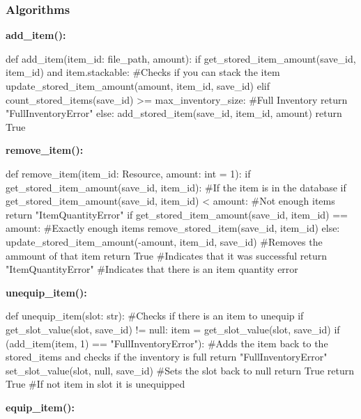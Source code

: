 \documentclass{article}
\begin{document}
        \subsubsection{Algorithms}
        \textbf{add\_item():}\\
        \begin{python}
def add_item(item_id: file_path, amount):
   if get_stored_item_amount(save_id, item_id) and item.stackable: #Checks if you can stack the item
      update_stored_item_amount(amount, item_id, save_id)
   elif count_stored_items(save_id) >= max_inventory_size: #Full Inventory
      return "FullInventoryError"
   else:
      add_stored_item(save_id, item_id, amount)
   return True
        \end{python}
        \textbf{remove\_item():}\\
        \begin{python}
def remove_item(item_id: Resource, amount: int = 1):
   if get_stored_item_amount(save_id, item_id): #If the item is in the database
      if get_stored_item_amount(save_id, item_id) < amount: #Not enough items
         return "ItemQuantityError"
      if get_stored_item_amount(save_id, item_id) == amount: #Exactly enough items
         remove_stored_item(save_id, item_id)
      else:
         update_stored_item_amount(-amount, item_id, save_id) #Removes the ammount of that item
      return True #Indicates that it was successful
   return "ItemQuantityError" #Indicates that there is an item quantity error
        
        \end{python}
        \textbf{unequip\_item():}\\
        \begin{python}
def unequip_item(slot: str):
   #Checks if there is an item to unequip
   if get_slot_value(slot, save_id) != null:
      item = get_slot_value(slot, save_id)
      if (add_item(item, 1) == "FullInventoryError"): #Adds the item back to the stored_items and checks if the inventory is full
         return "FullInventoryError"     
      set_slot_value(slot, null, save_id) #Sets the slot back to null
      return True
   return True #If not item in slot it is unequipped
        \end{python}
        \textbf{equip\_item():}\\
\end{document}
